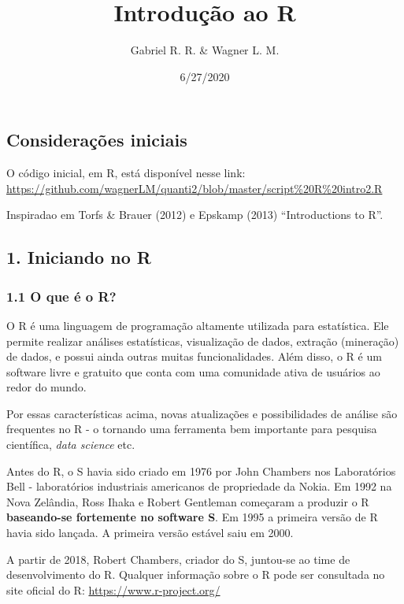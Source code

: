 \documentclass[
]{article}
\title{Introdução ao R}
\author{Gabriel R. R. \& Wagner L. M.}
\date{6/27/2020}
\begin{document}
\maketitle

\hypertarget{considerauxe7uxf5es-iniciais}{%
\subsection{Considerações iniciais}\label{considerauxe7uxf5es-iniciais}}

O código inicial, em R, está disponível nesse link:
\url{https://github.com/wagnerLM/quanti2/blob/master/script\%20R\%20intro2.R}

Inspiradao em Torfs \& Brauer (2012) e Epskamp (2013) ``Introductions to
R''.

\hypertarget{iniciando-no-r}{%
\subsection{1. Iniciando no R}\label{iniciando-no-r}}

\hypertarget{o-que-uxe9-o-r}{%
\subsubsection{1.1 O que é o R?}\label{o-que-uxe9-o-r}}

O R é uma linguagem de programação altamente utilizada para estatística.
Ele permite realizar análises estatísticas, visualização de dados,
extração (mineração) de dados, e possui ainda outras muitas
funcionalidades. Além disso, o R é um software livre e gratuito que
conta com uma comunidade ativa de usuários ao redor do mundo.

Por essas características acima, novas atualizações e possibilidades de
análise são frequentes no R - o tornando uma ferramenta bem importante
para pesquisa científica, \emph{data science} etc.

Antes do R, o S havia sido criado em 1976 por John Chambers nos
Laboratórios Bell - laboratórios industriais americanos de propriedade
da Nokia. Em 1992 na Nova Zelândia, Ross Ihaka e Robert Gentleman
começaram a produzir o R \textbf{baseando-se fortemente no software S}.
Em 1995 a primeira versão de R havia sido lançada. A primeira versão
estável saiu em 2000.

A partir de 2018, Robert Chambers, criador do S, juntou-se ao time de
desenvolvimento do R. Qualquer informação sobre o R pode ser consultada
no site oficial do R: \url{https://www.r-project.org/}
\end{document}
